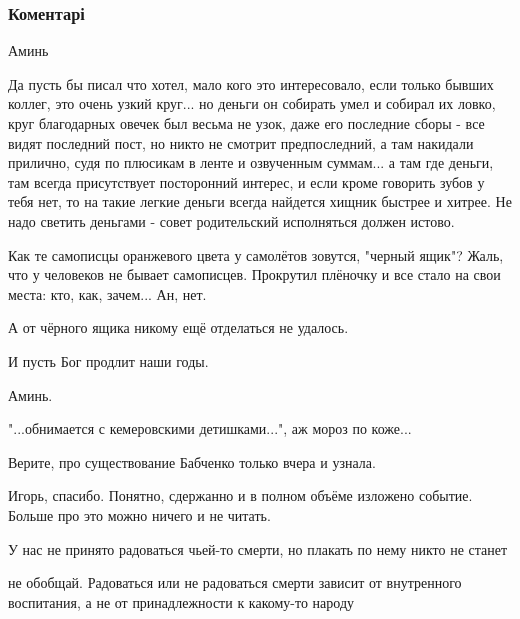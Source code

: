  
 
 
 
 
\subsubsection{Коментарі}

\begin{itemize} %
Аминь


Да пусть бы писал что хотел, мало кого это интересовало, если только бывших
коллег, это очень узкий круг... но деньги он собирать умел и собирал их ловко,
круг благодарных овечек был весьма не узок, даже его последние сборы - все
видят последний пост, но никто не смотрит предпоследний, а там накидали
прилично, судя по плюсикам в ленте и озвученным суммам... а там где деньги, там
всегда присутствует посторонний интерес, и если кроме говорить зубов у тебя
нет, то на такие легкие деньги всегда найдется хищник быстрее и хитрее. Не надо
светить деньгами - совет родительский исполняться должен истово.



Как те самописцы оранжевого цвета у самолётов зовутся, "черный ящик"? Жаль, что
у человеков не бывает самописцев. Прокрутил плёночку и все стало на свои места:
кто, как, зачем... Ан, нет.

А от чёрного ящика никому ещё отделаться не удалось.

И пусть Бог продлит наши годы.


Аминь.

"...обнимается с кемеровскими детишками...", аж мороз по коже...

Верите, про существование Бабченко только вчера и узнала.

Игорь, спасибо. Понятно, сдержанно и в полном объёме изложено событие. Больше про это можно ничего и не читать.

У нас не принято радоваться чьей-то смерти, но плакать по нему никто не станет

\begin{itemize} %
не обобщай. Радоваться или не радоваться смерти зависит от внутренного воспитания, а не от принадлежности к какому-то народу


\end{itemize}
\end{itemize}
